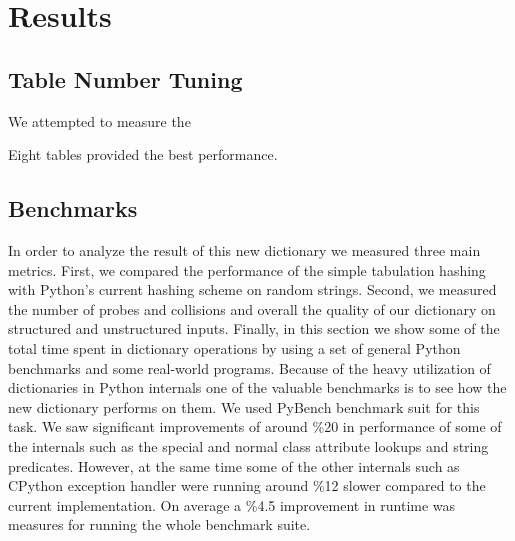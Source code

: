 \documentclass[11pt]{article}
\begin{document}
\section{Results}

\subsection{Table Number Tuning}
       
We attempted to measure the 
       
Eight tables provided the best performance.
\subsection{Benchmarks}
In order to analyze the result of this new dictionary we measured three main metrics. First, we compared the performance of the simple tabulation hashing with Python’s current hashing scheme on random strings. Second, we measured the number of probes and collisions and overall the quality of our dictionary on structured and unstructured inputs. Finally, in this section  we show some of the total time spent in dictionary operations by using a set of general Python benchmarks and some real-world programs.
Because of the heavy utilization of dictionaries in Python internals one of the valuable benchmarks is to see how the new dictionary performs on them. We used PyBench benchmark suit for this task. We saw significant improvements of around \%20 in performance of some of the internals such as the special and normal class attribute lookups and string predicates. However, at the same time some of the other internals such as CPython exception handler were running around \%12 slower compared to the current implementation. On average a \%4.5 improvement in runtime was measures for running the whole benchmark suite.
\end{document}
